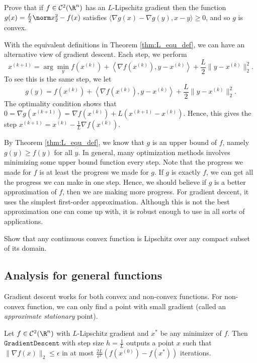 \begin{xca}
Prove that if $f\in{\cal C}^{2}(\R^{n})$ has an $L$-Lipschitz gradient
then the function $g(x)=\frac{L}{2}\norm x_{2}^{2}-f(x)$ satisfies
$\langle\nabla g(x)-\nabla g(y),x-y\rangle\ge0$, and so $g$ is convex.
\end{xca}

With the equivalent definitions in Theorem \ref{thm:L_equ_def}, we
can have an alternative view of gradient descent. Each step, we perform
\[
x^{(k+1)}=\arg\min_{y}f(x^{(k)})+\left\langle \nabla f(x^{(k)}),y-x^{(k)}\right\rangle +\frac{L}{2}\|y-x^{(k)}\|_{2}^{2}.
\]
To see this is the same step, we let 
\[
g(y)=f(x^{(k)})+\left\langle \nabla f(x^{(k)}),y-x^{(k)}\right\rangle +\frac{L}{2}\|y-x^{(k)}\|_{2}^{2}.
\]
The optimality condition shows that $0=\nabla g(x^{(k+1)})=\nabla f(x^{(k)})+L(x^{(k+1)}-x^{(k)})$.
Hence, this gives the step $x^{(k+1)}=x^{(k)}-\frac{1}{L}\nabla f(x^{(k)})$.

By Theorem \ref{thm:L_equ_def}, we know that $g$ is an upper bound
of $f$, namely $g(y)\geq f(y)$ for all $y$. In general, many optimization
methods involves minimizing some upper bound function every step.
Note that the progress we made for $f$ is at least the progress we
made for $g$. If $g$ is exactly $f$, we can get all the progress
we can make in one step. Hence, we should believe if $g$ is a better
approximation of $f$, then we are making more progress. For gradient
descent, it uses the simplest first-order approximation. Although
this is not the best approximation one can come up with, it is robust
enough to use in all sorts of applications.
\begin{xca}
Show that any continuous convex function is Lipschitz over any compact
subset of its domain.
\end{xca}


\subsection{Analysis for general functions}

Gradient descent works for both convex and non-convex functions. For
non-convex function, we can only find a point with small gradient
(called an \emph{approximate stationary} point).
\begin{thm}
\label{thm:gd_general}Let $f\in\mathcal{C}^{2}(\R^{n})$ with $L$-Lipschitz
gradient and $x^{*}$ be any minimizer of $f$. Then $\mathtt{GradientDescent}$
with step size $h=\frac{1}{L}$ outputs a point $x$ such that $\|\nabla f(x)\|_{2}\leq\epsilon$
in at most $\frac{2L}{\epsilon^{2}}\left(f(x^{(0)})-f(x^{*})\right)$
iterations.
\end{thm}


